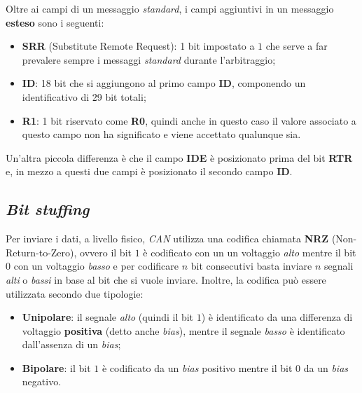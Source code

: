 Oltre ai campi di un messaggio \emph{standard}, i campi aggiuntivi in un messaggio \textbf{esteso} sono i seguenti:
\begin{itemize}
    \item \textbf{SRR} (Substitute Remote Request): 1 bit impostato a $1$ che serve a far prevalere sempre i messaggi \emph{standard} durante l'arbitraggio;
    \item \textbf{ID}: 18 bit che si aggiungono al primo campo \textbf{ID}, componendo un identificativo di 29 bit totali;
    \item \textbf{R1}: 1 bit riservato come \textbf{R0}, quindi anche in questo caso il valore associato a questo campo non ha significato e viene accettato qualunque sia.
\end{itemize}

Un'altra piccola differenza è che il campo \textbf{IDE} è posizionato prima del bit \textbf{RTR} e, in mezzo a questi due campi è posizionato il secondo campo \textbf{ID}.

\subsection{\emph{Bit stuffing}}
Per inviare i dati, a livello fisico, \emph{CAN} utilizza una codifica chiamata \textbf{NRZ} (Non-Return-to-Zero), ovvero il bit $1$ è codificato con un un voltaggio \emph{alto} mentre il bit $0$ con un voltaggio \emph{basso} e per codificare $n$ bit consecutivi basta inviare $n$ segnali \emph{alti} o \emph{bassi} in base al bit che si vuole inviare. Inoltre, la codifica può essere utilizzata secondo due tipologie:
\begin{itemize}
    \item \textbf{Unipolare}: il segnale \emph{alto} (quindi il bit $1$) è identificato da una differenza di voltaggio \textbf{positiva} (detto anche \emph{bias}), mentre il segnale \emph{basso} è identificato dall'assenza di un \emph{bias};
    \item \textbf{Bipolare}: il bit $1$ è codificato da un \emph{bias} positivo mentre il bit $0$ da un \emph{bias} negativo.
\end{itemize}

